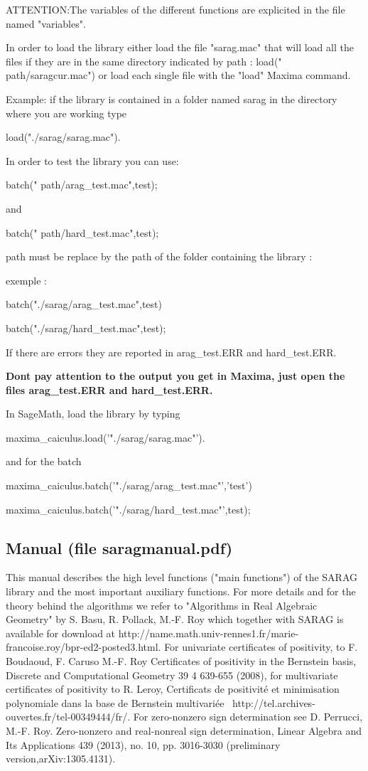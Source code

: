 \documentclass{article}
\begin{document}
ATTENTION:The variables of the different functions are explicited in the file
named "variables".



In order to load the library either load the file "sarag.mac" that will
load all the files if they are in the same directory indicated by {\color{red}
path} : load("{\color{red} path}/saragcur.mac") or load each single file with
the "load" Maxima command.

Example: if the library is contained in a folder named sarag in the
directory where you are working type

load("./sarag/sarag.mac").

In order to test the library you can use:

batch("{\color{red} path}/arag\_test.mac",test);

and

batch("{\color{red} path}/hard\_test.mac",test);

{\color{red} path} must be replace by the path of the folder containing the
library :

exemple :

batch("./sarag/arag\_test.mac",test)

batch("./sarag/hard\_test.mac",test);

If there are errors they are reported in arag\_test.ERR and hard\_test.ERR.

\textbf{Dont pay attention to the output you get in Maxima, just open the
files arag\_test.ERR and hard\_test.ERR.}

In SageMath, load the library by typing

maxima\_caiculus.load('"./sarag/sarag.mac"').

and for the batch

maxima\_caiculus.batch('"./sarag/arag\_test.mac"','test')

maxima\_caiculus.batch('"./sarag/hard\_test.mac"',test);

\subsection{Manual (file saragmanual.pdf)}



This manual describes the high level functions ("main functions") of the SARAG
library and the most important auxiliary functions.
For more details and for the theory behind the algorithms we refer to
"Algorithms in Real Algebraic Geometry" by S. Basu, R. Pollack, M.-F. Roy
which together with SARAG is available for download at
http://name.math.univ-rennes1.fr/marie-francoise.roy/bpr-ed2-posted3.html. For
univariate certificates of positivity, to F. Boudaoud, F. Caruso M.-F. Roy
Certificates of positivity in the Bernstein basis, Discrete and Computational
Geometry 39 4 639-655 (2008), for multivariate certificates of positivity to
R. Leroy, Certificats de positivit{\'e} et minimisation polynomiale dans la
base de Bernstein multivari{\'e}e \
http://tel.archives-ouvertes.fr/tel-00349444/fr/. For zero-nonzero sign
determination see D. Perrucci, M.-F. Roy. Zero-nonzero and real-nonreal sign
determination, Linear Algebra and Its Applications 439 (2013), no. 10, pp.
3016-3030 (preliminary version,arXiv:1305.4131).
\end{document}

